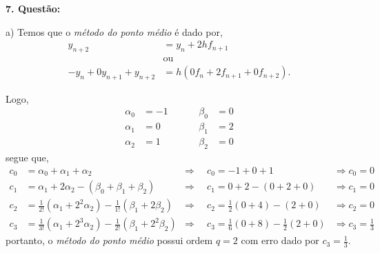 \documentclass[a4paper,12pt]{article}
\begin{document}
\begin{figure}[!ht]
\end{figure}


\pagebreak
\textbf{7. Quest\~ao:}

a) Temos que o \textit{m\'etodo do ponto m\'edio} \'e dado por,
	\begin{align*}
		y_{n+2} &= y_{n} + 2hf_{n+1}\\
		&\mbox{ou}\\
		-y_{n} + 0y_{n+1} + y_{n+2} &= h(0f_n + 2f_{n+1} + 0f_{n+2}). 
	\end{align*}

Logo,
	\begin{align*}
		\alpha_{0} &= -1 \hspace{1cm}& \beta_{0} &= 0\\
		\alpha_{1} &=  0 \hspace{1cm}& \beta_{1} &= 2\\
		\alpha_{2} &=  1 \hspace{1cm}& \beta_{2} &= 0
	\end{align*}
segue que,
	\begin{align*}
		c_{0} &= \alpha_{0} + \alpha_{1} + \alpha_{2} &\Rightarrow \hspace{6pt} &c_{0} = -1 + 0 + 1 &\Rightarrow c_{0} = 0\\
		c_{1} &= \alpha_{1} + 2 \alpha_{2} -(\beta_{0} + \beta_{1} + \beta_{2}) &\Rightarrow \hspace{6pt}  &c_{1} = 0 + 2 -(0 + 2 + 0)
		&\Rightarrow c_{1} = 0 \\
		c_{2} &= \frac{1}{2!}(\alpha_{1} + 2^{2}\alpha_{2}) - \frac{1}{1!}(\beta_{1} + 2\beta_{2})	&\Rightarrow
		\hspace{6pt} &c_{2} = \frac{1}{2}(0 + 4) -(2 + 0) &\Rightarrow c_{2}  = 0 \\
		c_{3} &= \frac{1}{3!}(\alpha_{1} + 2^{3} \alpha_{2}) -\frac{1}{2!}(\beta_{1} + 2^{2}\beta_{2}) &\Rightarrow
		\hspace{6pt} &c_{3} = \frac{1}{6}(0 + 8) -\frac{1}{2}(2 + 0) &\Rightarrow c_{3} = \frac{1}{3}
	\end{align*}
	portanto, o \textit{m\'etodo do ponto m\'edio} possui ordem $q = 2$ com erro dado por $c_{3} = \frac{1}{3}.$ 
\end{document}
